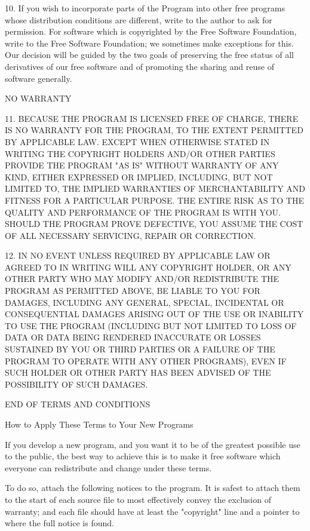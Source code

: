 \begin{DoxyCodeInclude}
  10. If you wish to incorporate parts of the Program into other free
programs whose distribution conditions are different, write to the author
to ask \textcolor{keywordflow}{for} permission.  For software which is copyrighted by the Free
Software Foundation, write to the Free Software Foundation; we sometimes
make exceptions \textcolor{keywordflow}{for} this.  Our decision will be guided by the two goals
of preserving the free status of all derivatives of our free software and
of promoting the sharing and reuse of software generally.

                            NO WARRANTY

  11. BECAUSE THE PROGRAM IS LICENSED FREE OF CHARGE, THERE IS NO WARRANTY
FOR THE PROGRAM, TO THE EXTENT PERMITTED BY APPLICABLE LAW.  EXCEPT WHEN
OTHERWISE STATED IN WRITING THE COPYRIGHT HOLDERS AND/OR OTHER PARTIES
PROVIDE THE PROGRAM \textcolor{stringliteral}{"AS IS"} WITHOUT WARRANTY OF ANY KIND, EITHER EXPRESSED
OR IMPLIED, INCLUDING, BUT NOT LIMITED TO, THE IMPLIED WARRANTIES OF
MERCHANTABILITY AND FITNESS FOR A PARTICULAR PURPOSE.  THE ENTIRE RISK AS
TO THE QUALITY AND PERFORMANCE OF THE PROGRAM IS WITH YOU.  SHOULD THE
PROGRAM PROVE DEFECTIVE, YOU ASSUME THE COST OF ALL NECESSARY SERVICING,
REPAIR OR CORRECTION.

  12. IN NO EVENT UNLESS REQUIRED BY APPLICABLE LAW OR AGREED TO IN WRITING
WILL ANY COPYRIGHT HOLDER, OR ANY OTHER PARTY WHO MAY MODIFY AND/OR
REDISTRIBUTE THE PROGRAM AS PERMITTED ABOVE, BE LIABLE TO YOU FOR DAMAGES,
INCLUDING ANY GENERAL, SPECIAL, INCIDENTAL OR CONSEQUENTIAL DAMAGES ARISING
OUT OF THE USE OR INABILITY TO USE THE PROGRAM (INCLUDING BUT NOT LIMITED
TO LOSS OF DATA OR DATA BEING RENDERED INACCURATE OR LOSSES SUSTAINED BY
YOU OR THIRD PARTIES OR A FAILURE OF THE PROGRAM TO OPERATE WITH ANY OTHER
PROGRAMS), EVEN IF SUCH HOLDER OR OTHER PARTY HAS BEEN ADVISED OF THE
POSSIBILITY OF SUCH DAMAGES.

                     END OF TERMS AND CONDITIONS

            How to Apply These Terms to Your New Programs

  If you develop a \textcolor{keyword}{new} program, and you want it to be of the greatest
possible use to the \textcolor{keyword}{public}, the best way to achieve \textcolor{keyword}{this} is to make it
free software which everyone can redistribute and change under these terms.

  To \textcolor{keywordflow}{do} so, attach the following notices to the program.  It is safest
to attach them to the start of each source file to most effectively
convey the exclusion of warranty; and each file should have at least
the \textcolor{stringliteral}{"copyright"} line and a pointer to where the full notice is found.


\end{DoxyCodeInclude}
